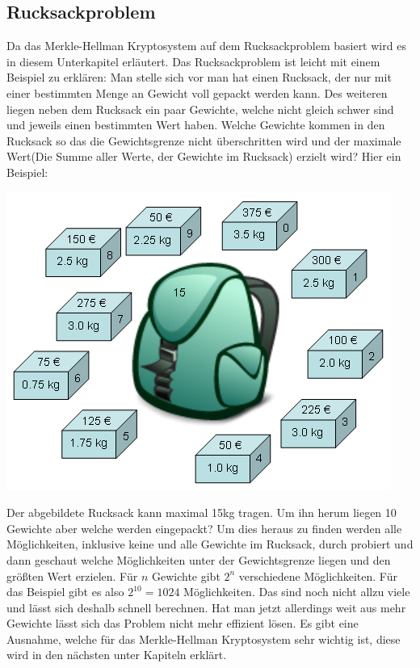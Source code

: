\documentclass[a4paper,12pt,titlepage]{article}
\begin{document}
\subsection{Rucksackproblem}\label{rucksack}
Da das Merkle-Hellman Kryptosystem auf dem Rucksackproblem basiert wird es in diesem Unterkapitel erläutert. \newline
Das Rucksackproblem ist leicht mit einem Beispiel zu erklären:
Man stelle sich vor man hat einen Rucksack, der nur mit einer bestimmten Menge an Gewicht voll gepackt werden kann. Des weiteren liegen neben dem Rucksack ein paar Gewichte, welche nicht gleich schwer sind und jeweils einen bestimmten Wert haben. Welche Gewichte kommen in den Rucksack so das die Gewichtsgrenze nicht überschritten wird und der maximale Wert(Die Summe aller Werte, der Gewichte im Rucksack) erzielt wird? \newline
Hier ein Beispiel:
\begin{center}
\includegraphics[scale=0.7]{rucksackproblem.png} %
\end{center}
Der abgebildete Rucksack kann maximal 15kg tragen. Um ihn herum liegen 10 Gewichte aber welche werden eingepackt? 
Um dies heraus zu finden werden alle Möglichkeiten, inklusive keine und alle Gewichte im Rucksack, durch probiert und dann geschaut welche Möglichkeiten unter der Gewichtsgrenze liegen und den größten Wert erzielen. Für $n$ Gewichte gibt $2^{n}$ verschiedene Möglichkeiten. Für das Beispiel gibt es also $2^{10} = 1024$ Möglichkeiten. Das sind noch nicht allzu viele und lässt sich deshalb schnell berechnen. Hat man jetzt allerdings weit aus mehr Gewichte lässt sich das Problem nicht mehr effizient lösen.
Es gibt eine Ausnahme, welche für das Merkle-Hellman Kryptosystem sehr wichtig ist, diese wird in den nächsten unter Kapiteln erklärt.
\end{document}
